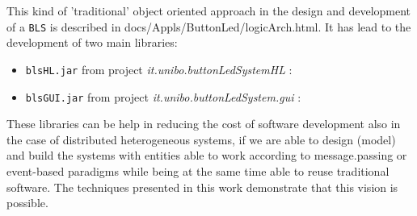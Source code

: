This kind of 'traditional' object oriented approach in the design and development of a \texttt{BLS} is described in docs/Appls/ButtonLed/logicArch.html. It has lead to the development of two main libraries:

\begin{itemize}
\item \texttt{blsHL.jar} from project  \textit{it.unibo.buttonLedSystemHL} : 
\item \texttt{blsGUI.jar} from project \textit{it.unibo.buttonLedSystem.gui} : 
\end{itemize}

These libraries can be help in reducing the cost of software development also in the case of distributed heterogeneous systems, if we are able to design (model) and build the systems with entities able to work according to message.passing or event-based paradigms while being at the same time able to reuse traditional software. The techniques presented in this work demonstrate that this vision is possible.

